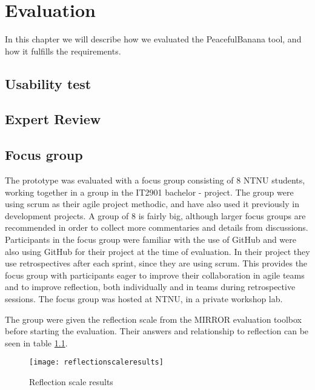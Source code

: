 \chapter{Evaluation}
In this chapter we will describe how we evaluated the PeacefulBanana tool, and how it fulfills the requirements.


\section{Usability test}

\section{Expert Review}


\section{Focus group}
The prototype was evaluated with a focus group consisting of 8 NTNU students, working together in a group in the IT2901 bachelor - project. The group were using scrum as their agile project methodic, and have also used it previously in development projects. A group of 8 is fairly big, although larger focus groups are recommended in order to collect more commentaries and details from discussions\cite{morgan1998planning}. Participants in the focus group were familiar with the use of GitHub and were also using GitHub for their project at the time of evaluation. In their project they use retrospectives after each sprint, since they are using scrum. This provides the focus group with participants eager to improve their collaboration in agile teams and to improve reflection, both individually and in teams during retrospective sessions. The focus group was hosted at NTNU, in a private workshop lab. 

The group were given the reflection scale from the MIRROR evaluation toolbox before starting the evaluation. Their answers and relationship to reflection can be seen in table \ref{mirrormodel}. 
\begin{figure}[H]
\centering
	\texttt{[image: reflectionscaleresults]}
\caption{Reflection scale results}
\label{mirrormodel}
\end{figure}

